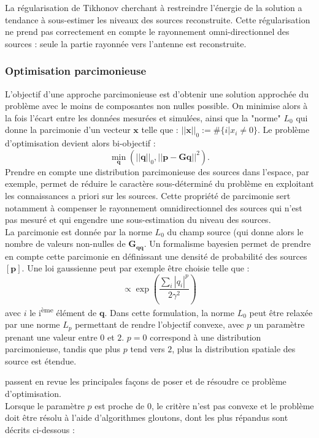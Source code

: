 La régularisation de Tikhonov cherchant à restreindre l'énergie de la solution a tendance à sous-estimer les niveaux des sources reconstruite. Cette régularisation ne prend pas correctement en compte le rayonnement omni-directionnel des sources : seule la partie rayonnée vers l'antenne est reconstruite. 

\subsubsection{Optimisation parcimonieuse }
L'objectif d'une approche parcimonieuse est d'obtenir une solution approchée du problème avec le moins de composantes non nulles possible. On minimise alors à la fois l'écart entre les données mesurées et simulées, ainsi que la "norme" $L_0$ qui donne la parcimonie d'un vecteur $\bm{x}$ telle que : $||\bm{x}||_0 := \#\{i|x_i\neq0\}$. Le problème d'optimisation devient alors bi-objectif : 
\begin{equation}
	\min_{\bm{q}}(||\bm{q}||_0 , ||\bm{p}-\bm{G}\bm{q}||^2) .
	\label{bi-objectif}
\end{equation}
Prendre en compte une distribution parcimonieuse des sources dans l'espace, par exemple, permet de réduire le caractère sous-déterminé du problème en exploitant les connaissances a priori sur les sources. Cette propriété de parcimonie sert notamment à compenser le rayonnement omnidirectionnel des sources qui n'est pas mesuré et qui engendre une sous-estimation du niveau des sources. \\
La parcimonie est donnée par la norme $L_0$ du champ source (qui donne alors le nombre de valeurs non-nulles de $\bm{G_{qq}}$. Un formalisme bayesien permet de prendre en compte cette parcimonie en définissant une densité de probabilité des sources $[\bm{p}]$. Une loi gaussienne peut par exemple être choisie telle que : 
\begin{equation}
 [\bm{p}] \propto \exp\left(\frac{\sum_i |q_i|^p}{2\gamma^2}\right)
\end{equation}
avec $i$ le i\textsuperscript{ème} élément de $\bm{q}$. Dans cette formulation, la norme $L_0$ peut être relaxée par une norme $L_p$ permettant de rendre l'objectif convexe, avec $p$ un paramètre prenant une valeur entre $0$ et $2$. $p=0$ correspond à une distribution parcimonieuse, tandis que plus $p$ tend vers $2$, plus la distribution spatiale des source est étendue.

\cite{Tropp2010} passent en revue les principales façons de poser et de résoudre ce problème d'optimisation.\\
Lorsque le paramètre $p$ est proche de 0, le critère n'est pas convexe et le problème doit être résolu à l'aide d'algorithmes gloutons, dont les plus répandus sont décrits ci-dessous : 
